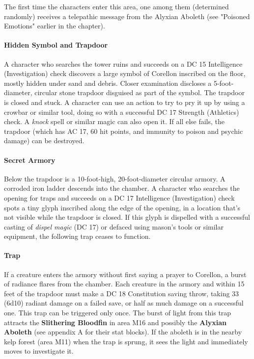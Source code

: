 \documentclass[10pt,a4,twoside,twocolumn,openany,nodeprecatedcode]{dndbook}
\begin{document}
The first time the characters enter this area, one among them (determined randomly) receives a telepathic message from the Alyxian Aboleth (see "Poisoned Emotions" earlier in the chapter).
\paragraph{Hidden Symbol and Trapdoor}
A character who searches the tower ruins and succeeds on a DC 15 Intelligence (Investigation) check discovers a large symbol of Corellon inscribed on the floor, mostly hidden under sand and debris. Closer examination discloses a 5-foot-diameter, circular stone trapdoor disguised as part of the symbol. The trapdoor is closed and stuck. A character can use an action to try to pry it up by using a crowbar or similar tool, doing so with a successful DC 17 Strength (Athletics) check. A \textit{knock} spell or similar magic can also open it. If all else fails, the trapdoor (which has AC 17, 60 hit points, and immunity to poison and psychic damage) can be destroyed.
\paragraph{Secret Armory}
Below the trapdoor is a 10-foot-high, 20-foot-diameter circular armory. A corroded iron ladder descends into the chamber.
A character who searches the opening for traps and succeeds on a DC 17 Intelligence (Investigation) check spots a tiny glyph inscribed along the edge of the opening, in a location that's not visible while the trapdoor is closed. If this glyph is dispelled with a successful casting of \textit{dispel magic} (DC 17) or defaced using mason's tools or similar equipment, the following trap ceases to function.
\paragraph{Trap}
If a creature enters the armory without first saying a prayer to Corellon, a burst of radiance flares from the chamber. Each creature in the armory and within 15 feet of the trapdoor must make a DC 18 Constitution saving throw, taking 33 (6d10) radiant damage on a failed save, or half as much damage on a successful one. This trap can be triggered only once.
The burst of light from this trap attracts the \textbf{Slithering Bloodfin} in area M16 and possibly the \textbf{Alyxian Aboleth} (see appendix A for their stat blocks). If the aboleth is in the nearby kelp forest (area M11) when the trap is sprung, it sees the light and immediately moves to investigate it.
\end{document}

